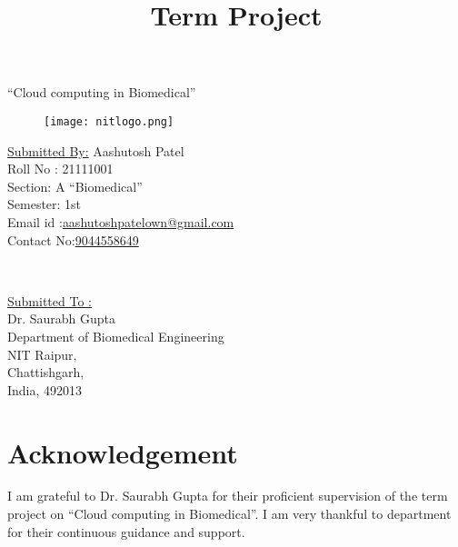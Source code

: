 \documentclass[12pt]{article}
\title{\Huge \textbf{Term Project}}
\begin{document}
	\centering
	{\Huge“Cloud computing in Biomedical”}
	\vspace{4mm}
	\begin{figure}[h]
		\centering
		\texttt{[image: nitlogo.png]}
	\end{figure}
	
	\vspace{1cm}
	\begin{minipage}{0.5\textwidth}
		\begin{flushleft}
			\Large
			\underline{ Submitted By:}
			\newline
			Aashutosh Patel
			\\
			Roll No : 21111001
			\\
			Section: A “Biomedical”
			\\
			Semester: 1st
			\\
			Email id :\href{mailto:aashutoshpatelown@gmail.com}{aashutoshpatelown@gmail.com}
			\\
			Contact No:\href{tel:9044558649}{9044558649}
			
			
		\end{flushleft}
	\end{minipage}
	~
	\begin{minipage}{0.4\textwidth}
		\begin{flushright}
			\Large
			\underline{ Submitted To :}\\
			
			
			Dr. Saurabh Gupta \\ Department of Biomedical Engineering\\
			NIT Raipur,\\ Chattishgarh,\\
			India, 492013\\
			
			
			
			
		\end{flushright}
	\end{minipage}
	\clearpage 
	
	

	\section*{\Huge Acknowledgement}
	\raggedright
	\LARGE I am grateful to Dr. Saurabh Gupta for their proficient supervision of the term project on “Cloud computing in Biomedical”. I am very thankful to department for their continuous guidance and support.\\
	
	\raggedleft
	
\end{document}
